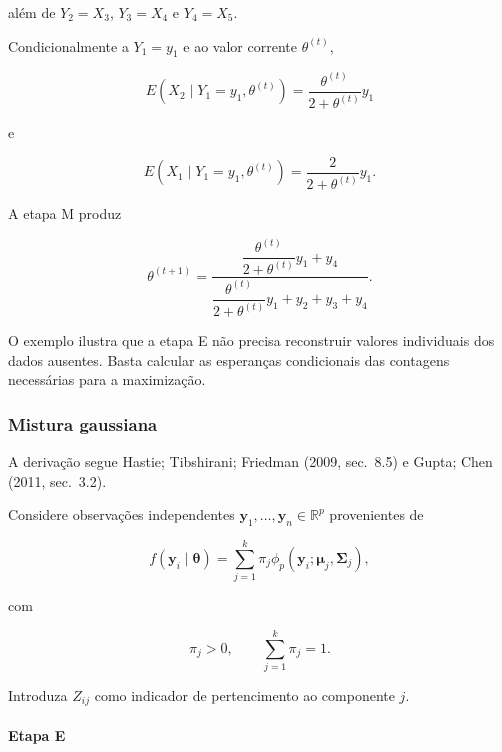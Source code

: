 \documentclass[
  letterpaper,
  DIV=11,
  numbers=noendperiod]{scrreprt}
\let\oldparagraph\paragraph
\renewcommand{\paragraph}[1]{\oldparagraph{#1}\mbox{}}
\begin{document}
além de \(Y_2=X_3\), \(Y_3=X_4\) e \(Y_4=X_5\).

Condicionalmente a \(Y_1=y_1\) e ao valor corrente \(\theta^{(t)}\),

\[E(X_2\mid Y_1=y_1,\theta^{(t)})
=
\frac{\theta^{(t)}}{2+\theta^{(t)}}y_1\]

e

\[E(X_1\mid Y_1=y_1,\theta^{(t)})
=
\frac{2}{2+\theta^{(t)}}y_1.\]

A etapa M produz

\[\theta^{(t+1)}
=
\frac{
\dfrac{\theta^{(t)}}{2+\theta^{(t)}}y_1+y_4
}{
\dfrac{\theta^{(t)}}{2+\theta^{(t)}}y_1+y_2+y_3+y_4
}.\]

O exemplo ilustra que a etapa E não precisa reconstruir valores
individuais dos dados ausentes. Basta calcular as esperanças
condicionais das contagens necessárias para a maximização.

\subsubsection{Mistura gaussiana}\label{mistura-gaussiana}

\begin{tcolorbox}[enhanced jigsaw, colback=white, leftrule=.75mm, colbacktitle=quarto-callout-tip-color!10!white, breakable, titlerule=0mm, bottomtitle=1mm, title=\textcolor{quarto-callout-tip-color}{\faLightbulb}\hspace{0.5em}{Exemplo 2 --- mistura de \(k\) distribuições normais}, colframe=quarto-callout-tip-color-frame, toprule=.15mm, opacityback=0, bottomrule=.15mm, opacitybacktitle=0.6, arc=.35mm, toptitle=1mm, rightrule=.15mm, coltitle=black, left=2mm]

A derivação segue Hastie; Tibshirani; Friedman (2009, sec.~8.5) e Gupta;
Chen (2011, sec.~3.2).

\end{tcolorbox}

Considere observações independentes
\(\boldsymbol{y}_1,\ldots,\boldsymbol{y}_n\in\mathbb{R}^p\) provenientes
de

\[f(\boldsymbol{y}_i\mid\boldsymbol{\theta})
=
\sum_{j=1}^k
\pi_j
\phi_p
(\boldsymbol{y}_i;\boldsymbol{\mu}_j,\boldsymbol{\Sigma}_j),\]

com

\[\pi_j>0,
\qquad
\sum_{j=1}^k\pi_j=1.\]

Introduza \(Z_{ij}\) como indicador de pertencimento ao componente
\(j\).

\paragraph{Etapa E}\label{etapa-e}
\end{document}
